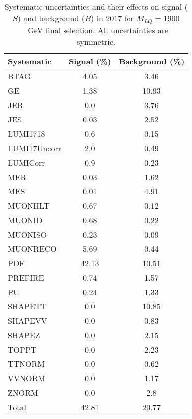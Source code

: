 \begin{table}[htbp]
\begin{center}
\caption{Systematic uncertainties and their effects on signal ($S$) and background ($B$) in 2017 for $M_{LQ}=1900$~GeV final selection. All uncertainties are symmetric.}
\begin{tabular}{lcc}
\hline\hline
Systematic & Signal (\%) & Background (\%) \\ \hline 
BTAG & 4.05 & 3.46\\ 
GE & 1.38 & 10.93\\ 
JER & 0.0 & 3.76\\ 
JES & 0.03 & 2.52\\ 
LUMI1718 & 0.6 & 0.15\\ 
LUMI17Uncorr & 2.0 & 0.49\\ 
LUMICorr & 0.9 & 0.23\\ 
MER & 0.03 & 1.62\\ 
MES & 0.01 & 4.91\\ 
MUONHLT & 0.67 & 0.12\\ 
MUONID & 0.68 & 0.22\\ 
MUONISO & 0.23 & 0.09\\ 
MUONRECO & 5.69 & 0.44\\ 
PDF & 42.13 & 10.51\\ 
PREFIRE & 0.74 & 1.57\\ 
PU & 0.24 & 1.33\\ 
SHAPETT & 0.0 & 10.85\\ 
SHAPEVV & 0.0 & 0.83\\ 
SHAPEZ & 0.0 & 2.15\\ 
TOPPT & 0.0 & 2.23\\ 
TTNORM & 0.0 & 0.62\\ 
VVNORM & 0.0 & 1.17\\ 
ZNORM & 0.0 & 2.8\\ 
Total & 42.81 & 20.77\\ \hline \hline
\end{tabular}
\label{tab:SysUncertainties_uujj_1900}
\end{center}
\end{table}

